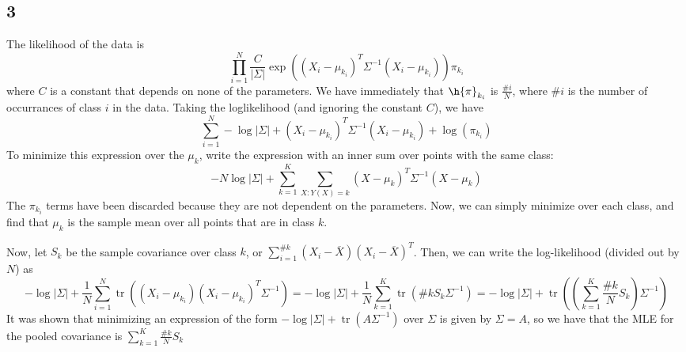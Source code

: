 \documentclass{article}
\newcommand{\conj}{\overline}
\DeclareMathOperator{\tr}{tr}
\begin{document}
\subsection*{3}
The likelihood of the data is 
\[\prod_{i=1}^N\frac{C}{|\Sigma|}\exp\left((X_i-\mu_{k_i})^T\Sigma^{-1}(X_i-\mu_{k_i})\right)\pi_{k_i}\]
where $C$ is a constant that depends on none of the parameters. We have immediately that $\h{\pi}_{k_i}$ is $\frac{\#i}{N}$, where $\#i$ is the number of occurrances of class $i$ in the data. Taking the loglikelihood (and ignoring the constant $C$), we have
\[\sum_{i=1}^N-\log|\Sigma|+(X_i-\mu_{k_i})^T\Sigma^{-1}(X_i-\mu_{k_i})+\log(\pi_{k_i})\]
To minimize this expression over the $\mu_k$, write the expression with an inner sum over points with the same class:
\[-N\log|\Sigma|+\sum_{k=1}^K\sum_{X:Y(X)=k}(X-\mu_k)^T\Sigma^{-1}(X-\mu_k)\]
The $\pi_{k_i}$ terms have been discarded because they are not dependent on the parameters. Now, we can simply minimize over each class, and find that $\mu_k$ is the sample mean over all points that are in class $k$. 

Now, let $S_k$ be the sample covariance over class $k$, or $\sum_{i=1}^{\#k}(X_i-\conj{X})(X_i-\conj{X})^T$. Then, we can write the log-likelihood (divided out by $N$) as
\[-\log|\Sigma|+\frac{1}{N}\sum_{i=1}^N\tr\left((X_i-\mu_{k_i})(X_i-\mu_{k_i})^T\Sigma^{-1}\right)=-\log|\Sigma|+\frac{1}{N}\sum_{k=1}^K\tr\left(\#kS_k\Sigma^{-1}\right)=-\log|\Sigma|+\tr\left(\left(\sum_{k=1}^K\frac{\#k}{N}S_k\right)\Sigma^{-1}\right)\]
It was shown that minimizing an expression of the form $-\log|\Sigma|+\tr(A\Sigma^{-1})$ over $\Sigma$ is given by $\Sigma=A$, so we have that the MLE for the pooled covariance is $\sum_{k=1}^K\frac{\#k}{N}S_k$
\end{document}
